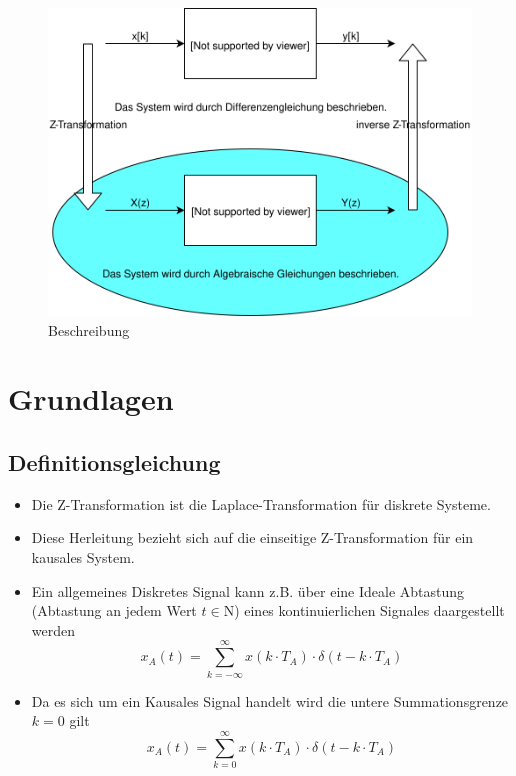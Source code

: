 \documentclass[11pt]{article}
\makeatletter
\def\maxwidth{\ifdim\Gin@nat@width>\linewidth\linewidth
    \else\Gin@nat@width\fi}
\let\Oldincludegraphics\includegraphics
\renewcommand{\includegraphics}[1]{\Oldincludegraphics[width=.8\maxwidth]{#1}}
\providecommand{\tightlist}{%
      \setlength{\itemsep}{0pt}\setlength{\parskip}{0pt}}
\makeatother
\begin{document}
    \begin{figure}
\centering
\includegraphics{Beschreibung.svg}
\caption{Beschreibung}
\end{figure}

    \section{Grundlagen}\label{grundlagen}

\subsection{Definitionsgleichung}\label{definitionsgleichung}

\begin{itemize}
\item
  Die Z-Transformation ist die Laplace-Transformation für diskrete
  Systeme.
\item
  Diese Herleitung bezieht sich auf die einseitige Z-Transformation für
  ein kausales System.
\end{itemize}

    \begin{itemize}
\tightlist
\item
  Ein allgemeines Diskretes Signal kann z.B. über eine Ideale Abtastung
  (Abtastung an jedem Wert \(t \in\mathrm{N}\)) eines kontinuierlichen
  Signales daargestellt werden
  \[x_A(t)=\sum_{k=-\infty}^\infty x( k \cdot T_A ) \cdot \delta ( t - k \cdot T_A )\label{eq:xAti}\]
\end{itemize}

    \begin{itemize}
\tightlist
\item
  Da es sich um ein Kausales Signal handelt wird die untere
  Summationsgrenze \(k = 0\) gilt
  \[x_A(t)=\sum_{k=0}^\infty x( k \cdot T_A ) \cdot \delta ( t - k \cdot T_A )\label{eq:xAtn}\]
\end{itemize}
\end{document}
